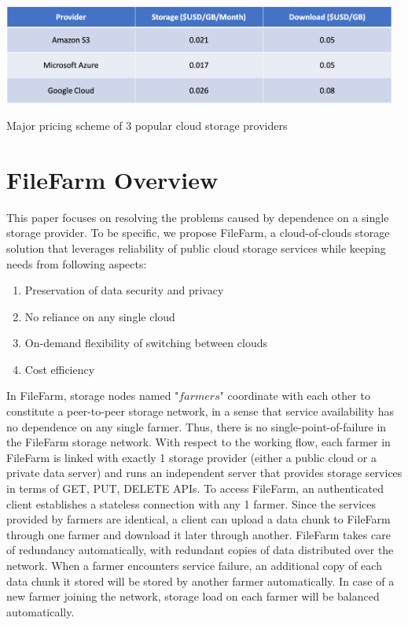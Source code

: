 \begin{table}[hbt]
\centering
  \includegraphics[width=13cm]{tables/table_cloud_storage_cost.png}
  \caption{Major pricing scheme of 3 popular cloud storage providers}
  \label{table:cloudstoragecost}
\end{table}

\newpage

\section{FileFarm Overview}
\label{s:filefarmoverview}
This paper focuses on resolving the problems caused by dependence on a single storage provider. To be specific, we propose FileFarm, a cloud-of-clouds storage solution that leverages reliability of public cloud storage services while keeping needs from following aspects:

\begin{enumerate}
    \item Preservation of data security and privacy
    \item No reliance on any single cloud
    \item On-demand flexibility of switching between clouds
    \item Cost efficiency
\end{enumerate}

In FileFarm, storage nodes named "$farmers$" coordinate with each other to constitute a peer-to-peer storage network, in a sense that service availability has no dependence on any single farmer. Thus, there is no single-point-of-failure in the FileFarm storage network. With respect to the working flow, each farmer in FileFarm is linked with exactly 1 storage provider (either a public cloud or a private data server) and runs an independent server that provides storage services in terms of GET, PUT, DELETE APIs. To access FileFarm, an authenticated client establishes a stateless connection with any 1 farmer. Since the services provided by farmers are identical, a client can upload a data chunk to FileFarm through one farmer and download it later through another. FileFarm takes care of redundancy automatically, with redundant copies of data distributed over the network. When a farmer encounters service failure, an additional copy of each data chunk it stored will be stored by another farmer automatically. In case of a new farmer joining the network, storage load on each farmer will be balanced automatically.

